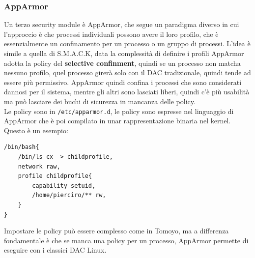 \documentclass[12pt, oneside]{extbook} %
\begin{document}
\subsubsection{AppArmor}
Un terzo security module è AppArmor, che segue un paradigma diverso in cui l'approccio è che processi individuali possono avere il loro profilo, che è essenzialmente un confinamento per un processo o un gruppo di processi. L'idea è simile a quella di S.M.A.C.K, data la complessità di definire i profili AppArmor adotta la policy del \textbf{selective confinment}, quindi se un processo non matcha nessuno profilo, quel processo girerà solo con il DAC tradizionale, quindi tende ad essere più permissivo. AppArmor quindi confina i processi che sono considerati dannosi per il sistema, mentre gli altri sono lasciati liberi, quindi c'è più usabilità ma può lasciare dei buchi di sicurezza in mancanza delle policy.\\Le policy sono in \texttt{/etc/apparmor.d}, le policy sono espresse nel linguaggio di AppArmor che è poi compilato in unar rappresentazione binaria nel kernel. Questo è un esempio:
\begin{lstlisting}
/bin/bash{
	/bin/ls cx -> childprofile,
	network raw,
	profile childprofile{
		capability setuid,
		/home/pierciro/** rw,	
	}
}
\end{lstlisting}
Impostare le policy può essere complesso come in Tomoyo, ma a differenza fondamentale è che se manca una policy per un processo, AppArmor permette di eseguire con i classici DAC Linux.
\end{document}
